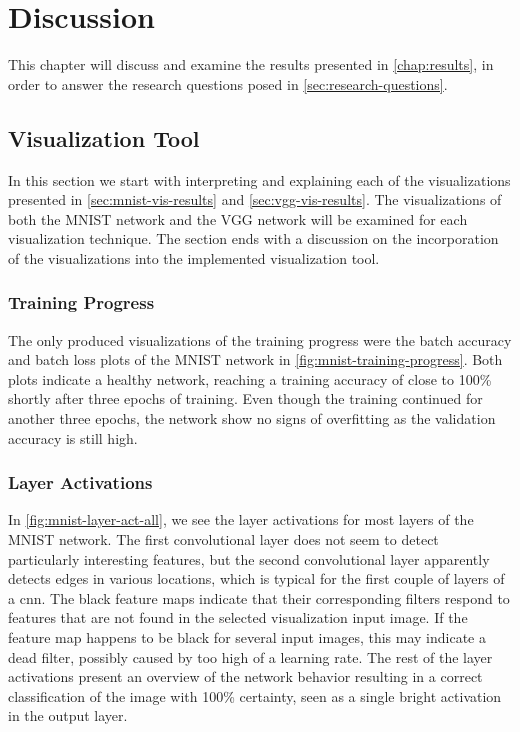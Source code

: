 
\chapter{Discussion} \label{chap:discussion}

This chapter will discuss and examine the results presented in \autoref{chap:results}, in order to answer the research questions posed in \autoref{sec:research-questions}.

\section{Visualization Tool}

In this section we start with interpreting and explaining each of the visualizations presented in \autoref{sec:mnist-vis-results} and \autoref{sec:vgg-vis-results}. The visualizations of both the MNIST network and the VGG network will be examined for each visualization technique. The section ends with a discussion on the incorporation of the visualizations into the implemented visualization tool.


\subsection{Training Progress}

The only produced visualizations of the training progress were the batch accuracy and batch loss plots of the MNIST network in \autoref{fig:mnist-training-progress}. Both plots indicate a healthy network, reaching a training accuracy of close to 100\% shortly after three epochs of training. Even though the training continued for another three epochs, the network show no signs of overfitting as the validation accuracy is still high.

\subsection{Layer Activations}

In \autoref{fig:mnist-layer-act-all}, we see the layer activations for most layers of the MNIST network. The first convolutional layer does not seem to detect particularly interesting features, but the second convolutional layer apparently detects edges in various locations, which is typical for the first couple of layers of a \acrshort{cnn}. The black feature maps indicate that their corresponding filters respond to features that are not found in the selected visualization input image. If the feature map happens to be black for several input images, this may indicate a dead filter, possibly caused by too high of a learning rate. The rest of the layer activations present an overview of the network behavior resulting in a correct classification of the image with 100\% certainty, seen as a single bright activation in the output layer. \\

